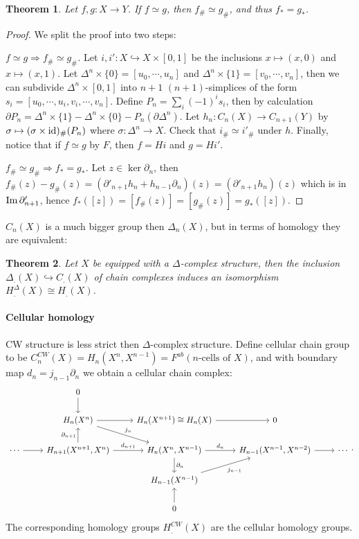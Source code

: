 \documentclass[11pt]{article}
\theoremstyle{definition}
\theoremstyle{plain}
\newtheorem{theorem}{Theorem}[section]
\newcommand{\id}{\textup{id}}
\newcommand{\im}{\textup{Im}\,}
\begin{document}
\begin{theorem}
Let $f,g:X\to Y$. If $f\simeq g$, then $f_\#\simeq g_\#$, and thus $f_\ast=g_\ast$.
\end{theorem}
\begin{proof}
We split the proof into two steps:\medbreak

\textit{$f\simeq g\Rightarrow f_\#\simeq g_\#$.} Let $i,i':X\hookrightarrow X\times[0,1]$ be the inclusions $x\mapsto(x,0)$ and $x\mapsto(x,1)$. Let $\Delta^n\times\{0\}=[u_0,\cdots,u_n]$ and $\Delta^n\times\{1\}=[v_0,\cdots,v_n]$, then we can subdivide $\Delta^n\times[0,1]$ into $n+1$ $(n+1)$-simplices of the form $s_i=[u_0,\cdots,u_i,v_i,\cdots,v_n]$. Define $P_n=\sum_i(-1)^is_i$, then by calculation $\partial P_n=\Delta^n\times\{1\}-\Delta^n\times\{0\}-P_n(\partial\Delta^n)$. Let $h_n:C_n(X)\to C_{n+1}(Y)$ by $\sigma\mapsto(\sigma\times\id)_\#(P_n)$ where $\sigma:\Delta^n\to X$. Check that $i_\#\simeq i'_\#$ under $h$. Finally, notice that if $f\simeq g$ by $F$, then $f=Hi$ and $g=Hi'$.\medbreak

\textit{$f_\#\simeq g_\#\Rightarrow f_\ast=g_\ast$.} Let $z\in\ker\partial_n$, then $f_\#(z)-g_\#(z)=(\partial'_{n+1}h_n+h_{n-1}\partial_n)(z)=(\partial'_{n+1}h_n)(z)$ which is in $\im\partial'_{n+1}$, hence $f_\ast([z])=[f_\#(z)]=[g_\#(z)]=g_\ast([z])$.
\end{proof}

$C_n(X)$ is a much bigger group then $\Delta_n(X)$, but in terms of homology they are equivalent:

\begin{theorem}
Let $X$ be equipped with a $\Delta$-complex structure, then the inclusion $\Delta_.(X)\hookrightarrow C_.(X)$ of chain complexes induces an isomorphism $H_.^\Delta(X)\cong H_.(X)$.
\end{theorem}

\paragraph{Cellular homology}

CW structure is less strict then $\Delta$-complex structure. Define cellular chain group to be $C_n^{CW}(X)=H_n(X^n,X^{n-1})=F^{ab}(n\textrm{-cells of }X)$, and with boundary map $d_n=j_{n-1}\partial_n$ we obtain a cellular chain complex:
\[\begin{tikzcd}[column sep=small]
&&0\arrow[d]&&&&&&\\
&&H_n(X^n)\arrow[rrd, "j_n"]\arrow[rr]&&H_n(X^{n+1})\cong H_n(X)\arrow[rr]&&0&&\\
\cdots\arrow[rr]&&{H_{n+1}(X^{n+1},X^n)}\arrow[u,"\partial_{n+1}"]\arrow[rr,"d_{n+1}"]&& {H_n(X^n,X^{n-1})}\arrow[rr, "d_n"] \arrow[d, "\partial_n"] &  & {H_{n-1}(X^{n-1},X^{n-2})} \arrow[rr]&&\cdots\\
&&&&H_{n-1}(X^{n-1})\arrow[rru,"j_{n-1}"']&&&&\\
&&&&0\arrow[u]&&&&       
\end{tikzcd}.\]
The corresponding homology groups $H_.^{CW}(X)$ are the cellular homology groups.\medbreak
\end{document}
